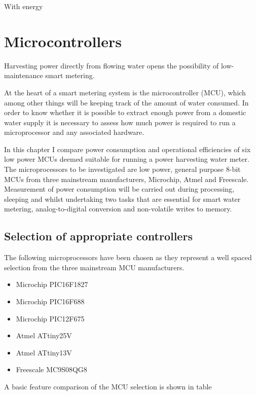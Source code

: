 
With energy 

\section{Microcontrollers}


Harvesting power directly from flowing water opens the possibility of low-maintenance smart metering.


At the heart of a smart metering system is the microcontroller (MCU),
which among other things will be keeping track of the amount of water
consumed. In order to know whether it is possible to extract enough
power from a domestic water supply it is necessary to assess how much
power is required to run a microprocessor and any associated hardware.

In this chapter I compare power consumption and operational efficiencies
of six low power MCUs deemed suitable for running a power harvesting
water meter. The microprocessors to be investigated are low power,
general purpose 8-bit MCUs from three mainstream manufacturers, Microchip,
Atmel and Freescale. Measurement of power consumption will be carried
out during processing, sleeping and whilst undertaking two tasks that
are essential for smart water metering, analog-to-digital conversion
and non-volatile writes to memory.


\subsection{Selection of appropriate controllers}

The following microprocessors have been chosen as they represent a
well spaced selection from the three mainstream MCU manufacturers.
\begin{itemize}
\item Microchip PIC16F1827
\item Microchip PIC16F688
\item Microchip PIC12F675
\item Atmel ATtiny25V
\item Atmel ATtiny13V
\item Freescale MC9S08QG8
\end{itemize}
A basic feature comparison of the MCU selection is shown in table

